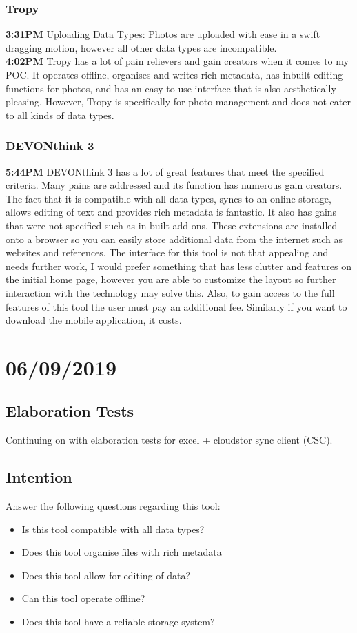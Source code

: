 \documentclass{article}
\begin{document}
\subsubsection{Tropy}
\textbf{3:31PM} Uploading Data Types: Photos are uploaded with ease in a swift dragging motion, however all other data types are incompatible. \\
\textbf{4:02PM} Tropy has a lot of pain relievers and gain creators when it comes to my POC. It operates offline, organises and writes rich metadata, has inbuilt editing functions for photos, and has an easy to use interface that is also aesthetically pleasing. However, Tropy is specifically for photo management and does not cater to all kinds of data types. 

\subsubsection{DEVONthink 3}
\textbf{5:44PM} DEVONthink 3 has a lot of great features that meet the specified criteria. Many pains are addressed and its function has numerous gain creators. The fact that it is compatible with all data types, syncs to an online storage, allows editing of text and provides rich metadata is fantastic. It also has gains that were not specified such as in-built add-ons. These extensions are installed onto a browser so you can easily store additional data from the internet such as websites and references. The interface for this tool is not that appealing and needs further work, I would prefer something that has less clutter and features on the initial home page, however you are able to customize the layout so further interaction with the technology may solve this. Also, to gain access to the full features of this tool the user must pay an additional fee. Similarly if you want to download the mobile application, it costs. 

\section{06/09/2019}
\subsection{Elaboration Tests}
Continuing on with elaboration tests for excel + cloudstor sync client (CSC).
\subsection{Intention}
Answer the following questions regarding this tool:
\begin{itemize}
\item Is this tool compatible with all data types?
\item Does this tool organise files with rich metadata
\item Does this tool allow for editing of data?
\item Can this tool operate offline?
\item Does this tool have a reliable storage system?
\end{itemize}
\end{document}
